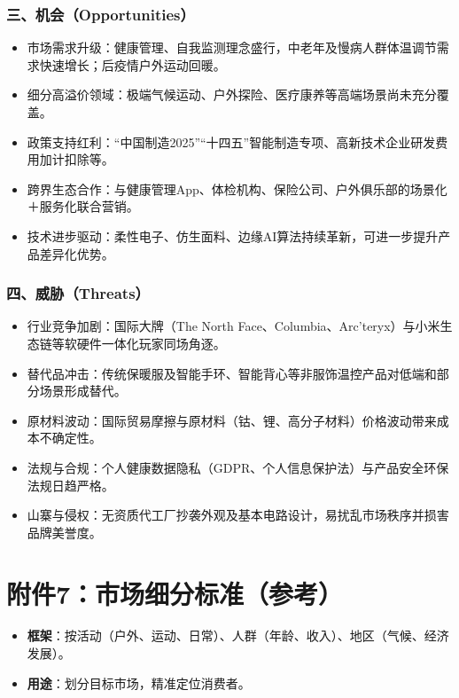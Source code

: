 \documentclass[UTF8]{report}
\theoremstyle{MyLineTheoremStyle} %
\theoremstyle{MyBlockTheoremStyle} %
\theoremstyle{MySubsubsectionStyle} %
\begin{document}
  \subsubsection{三、机会（Opportunities）}
    \begin{itemize}
      \item 市场需求升级：健康管理、自我监测理念盛行，中老年及慢病人群体温调节需求快速增长；后疫情户外运动回暖。  
      \item 细分高溢价领域：极端气候运动、户外探险、医疗康养等高端场景尚未充分覆盖。  
      \item 政策支持红利：“中国制造2025”“十四五”智能制造专项、高新技术企业研发费用加计扣除等。  
      \item 跨界生态合作：与健康管理App、体检机构、保险公司、户外俱乐部的场景化＋服务化联合营销。  
      \item 技术进步驱动：柔性电子、仿生面料、边缘AI算法持续革新，可进一步提升产品差异化优势。
    \end{itemize}

  \subsubsection{四、威胁（Threats）}
    \begin{itemize}
      \item 行业竞争加剧：国际大牌（The North Face、Columbia、Arc’teryx）与小米生态链等软硬件一体化玩家同场角逐。  
      \item 替代品冲击：传统保暖服及智能手环、智能背心等非服饰温控产品对低端和部分场景形成替代。  
      \item 原材料波动：国际贸易摩擦与原材料（钴、锂、高分子材料）价格波动带来成本不确定性。  
      \item 法规与合规：个人健康数据隐私（GDPR、个人信息保护法）与产品安全环保法规日趋严格。  
      \item 山寨与侵权：无资质代工厂抄袭外观及基本电路设计，易扰乱市场秩序并损害品牌美誉度。
    \end{itemize}

\section{附件7：市场细分标准（参考）}
\begin{itemize}
    \item \textbf{框架}：按活动（户外、运动、日常）、人群（年龄、收入）、地区（气候、经济发展）。
    \item \textbf{用途}：划分目标市场，精准定位消费者。
\end{itemize}
\end{document}
